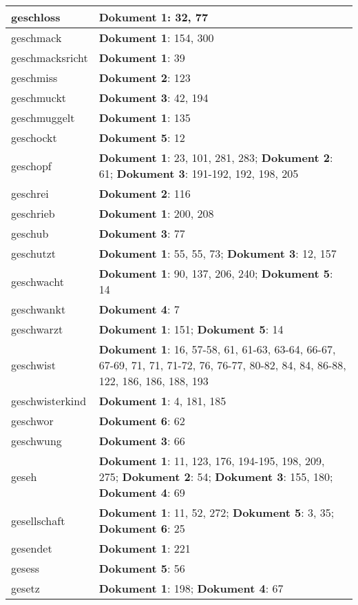 \documentclass[a5paper]{article}
\begin{document}
\begin{longtable}[l]{|l|p{3in}|}
\hline
geschloss & \textbf{Dokument 1}: 32, 77 \\
\hline
geschmack & \textbf{Dokument 1}: 154, 300 \\
\hline
geschmacksricht & \textbf{Dokument 1}: 39 \\
\hline
geschmiss & \textbf{Dokument 2}: 123 \\
\hline
geschmuckt & \textbf{Dokument 3}: 42, 194 \\
\hline
geschmuggelt & \textbf{Dokument 1}: 135 \\
\hline
geschockt & \textbf{Dokument 5}: 12 \\
\hline
geschopf & \textbf{Dokument 1}: 23, 101, 281, 283; \textbf{Dokument 2}: 61; \textbf{Dokument 3}: 191-192, 192, 198, 205 \\
\hline
geschrei & \textbf{Dokument 2}: 116 \\
\hline
geschrieb & \textbf{Dokument 1}: 200, 208 \\
\hline
geschub & \textbf{Dokument 3}: 77 \\
\hline
geschutzt & \textbf{Dokument 1}: 55, 55, 73; \textbf{Dokument 3}: 12, 157 \\
\hline
geschwacht & \textbf{Dokument 1}: 90, 137, 206, 240; \textbf{Dokument 5}: 14 \\
\hline
geschwankt & \textbf{Dokument 4}: 7 \\
\hline
geschwarzt & \textbf{Dokument 1}: 151; \textbf{Dokument 5}: 14 \\
\hline
geschwist & \textbf{Dokument 1}: 16, 57-58, 61, 61-63, 63-64, 66-67, 67-69, 71, 71, 71-72, 76, 76-77, 80-82, 84, 84, 86-88, 122, 186, 186, 188, 193 \\
\hline
geschwisterkind & \textbf{Dokument 1}: 4, 181, 185 \\
\hline
geschwor & \textbf{Dokument 6}: 62 \\
\hline
geschwung & \textbf{Dokument 3}: 66 \\
\hline
geseh & \textbf{Dokument 1}: 11, 123, 176, 194-195, 198, 209, 275; \textbf{Dokument 2}: 54; \textbf{Dokument 3}: 155, 180; \textbf{Dokument 4}: 69 \\
\hline
gesellschaft & \textbf{Dokument 1}: 11, 52, 272; \textbf{Dokument 5}: 3, 35; \textbf{Dokument 6}: 25 \\
\hline
gesendet & \textbf{Dokument 1}: 221 \\
\hline
gesess & \textbf{Dokument 5}: 56 \\
\hline
gesetz & \textbf{Dokument 1}: 198; \textbf{Dokument 4}: 67 \\

\end{longtable}
\end{document}
